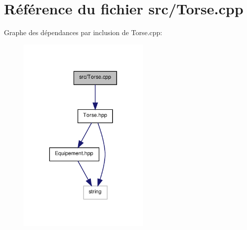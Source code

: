 \section{Référence du fichier src/\-Torse.cpp}
\label{_torse_8cpp}
Graphe des dépendances par inclusion de Torse.\-cpp\-:\nopagebreak
\begin{figure}[H]
\begin{center}
\leavevmode
\includegraphics[width=181pt]{_torse_8cpp__incl}
\end{center}
\end{figure}
